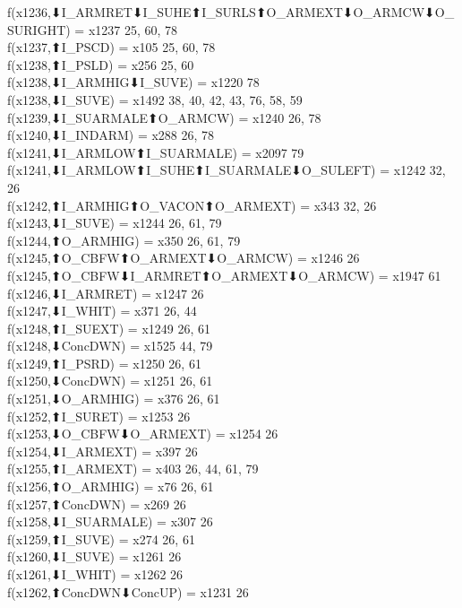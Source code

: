 f(x1236,⬇I_ARMRET⬇I_SUHE⬆I_SURLS⬆O_ARMEXT⬇O_ARMCW⬇O_SURIGHT) = x1237 {25, 60, 78} \\
f(x1237,⬆I_PSCD) = x105 {25, 60, 78} \\
f(x1238,⬆I_PSLD) = x256 {25, 60} \\
f(x1238,⬇I_ARMHIG⬇I_SUVE) = x1220 {78} \\
f(x1238,⬇I_SUVE) = x1492 {38, 40, 42, 43, 76, 58, 59} \\
f(x1239,⬇I_SUARMALE⬆O_ARMCW) = x1240 {26, 78} \\
f(x1240,⬇I_INDARM) = x288 {26, 78} \\
f(x1241,⬇I_ARMLOW⬆I_SUARMALE) = x2097 {79} \\
f(x1241,⬇I_ARMLOW⬆I_SUHE⬆I_SUARMALE⬇O_SULEFT) = x1242 {32, 26} \\
f(x1242,⬆I_ARMHIG⬆O_VACON⬆O_ARMEXT) = x343 {32, 26} \\
f(x1243,⬇I_SUVE) = x1244 {26, 61, 79} \\
f(x1244,⬆O_ARMHIG) = x350 {26, 61, 79} \\
f(x1245,⬆O_CBFW⬆O_ARMEXT⬇O_ARMCW) = x1246 {26} \\
f(x1245,⬆O_CBFW⬇I_ARMRET⬆O_ARMEXT⬇O_ARMCW) = x1947 {61} \\
f(x1246,⬇I_ARMRET) = x1247 {26} \\
f(x1247,⬇I_WHIT) = x371 {26, 44} \\
f(x1248,⬆I_SUEXT) = x1249 {26, 61} \\
f(x1248,⬇ConcDWN) = x1525 {44, 79} \\
f(x1249,⬆I_PSRD) = x1250 {26, 61} \\
f(x1250,⬇ConcDWN) = x1251 {26, 61} \\
f(x1251,⬇O_ARMHIG) = x376 {26, 61} \\
f(x1252,⬆I_SURET) = x1253 {26} \\
f(x1253,⬇O_CBFW⬇O_ARMEXT) = x1254 {26} \\
f(x1254,⬇I_ARMEXT) = x397 {26} \\
f(x1255,⬆I_ARMEXT) = x403 {26, 44, 61, 79} \\
f(x1256,⬆O_ARMHIG) = x76 {26, 61} \\
f(x1257,⬆ConcDWN) = x269 {26} \\
f(x1258,⬇I_SUARMALE) = x307 {26} \\
f(x1259,⬆I_SUVE) = x274 {26, 61} \\
f(x1260,⬇I_SUVE) = x1261 {26} \\
f(x1261,⬇I_WHIT) = x1262 {26} \\
f(x1262,⬆ConcDWN⬇ConcUP) = x1231 {26} \\
